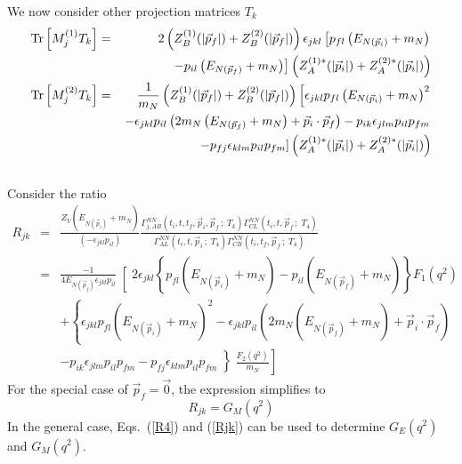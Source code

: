 \documentclass[12pt]{article}
\begin{document}
We now consider other projection matrices $T_k$
\begin{eqnarray}
{\rm Tr}\left[M_j^{(1)} T_k\right]
 &=& 2\left(Z_B^{(1)}(|\vec{p}_f|)+Z_B^{(2)}(|\vec{p}_f|)\right)
     \epsilon_{jkl}\left[p_{fl}\left(E_{N(\vec{p}_i)}+m_N\right)
     \right. \nonumber \\
  && \left. -p_{il}\left(E_{N(\vec{p}_f)}+m_N\right)\right]
     \left(Z_A^{(1)*}(|\vec{p}_i|)+Z_A^{(2)*}(|\vec{p}_i|)\right) \nonumber \\
{\rm Tr}\left[M_j^{(2)} T_k\right]
 &=& \frac{1}{m_N}\left(Z_B^{(1)}(|\vec{p}_f|)+Z_B^{(2)}(|\vec{p}_f|)\right)
     \left[\epsilon_{jkl}p_{fl}\left(E_{N(\vec{p}_i)}+m_N\right)^2
     \right. \nonumber \\
  && \left. -\epsilon_{jkl}p_{il}\left(2m_N\left(E_{N(\vec{p}_f)}+m_N\right)
     +\vec p_i\cdot\vec p_f\right)
     -p_{ik}\epsilon_{jlm}p_{il}p_{fm} \right.\nonumber \\
  && \left. -p_{fj}\epsilon_{klm}p_{il}p_{fm}
     \right]
     \left(Z_A^{(1)*}(|\vec{p}_i|)+Z_A^{(2)*}(|\vec{p}_i|)\right) \nonumber \\
\nonumber
\end{eqnarray}
Consider the ratio
\begin{eqnarray}
R_{jk} &=& \frac{Z_V\left(E_{N(\vec{p}_i)}+m_N\right)}
      {\left(-\epsilon_{jkl}p_{il}\right)}
      \frac{\Gamma^{NN}_{j,AB}(t_i,t,t_f,\vec p_i,\vec p_f\,;\;T_k)
      \Gamma^{NN}_{CL}(t_i,t,\vec p_f\,;\;T_4)}
      {\Gamma^{NN}_{AL}(t_i,t,\vec p_i\,;\;T_4)
      \Gamma^{NN}_{CB}(t_i,t_f,\vec p_f\,;\;T_4)} 
      \label{Rjkdef} \\
    &=& \left.\frac{-1}{4E_{N(\vec{p}_f)}\epsilon_{jkl}p_{il}}
        \right[
        2\epsilon_{jkl}\left\{p_{fl}\left(E_{N(\vec{p}_i)}+m_N\right)
        -p_{il}\left(E_{N(\vec{p}_f)}+m_N\right)\right\}F_1(q^2)
        \nonumber \\
     && +\left\{\epsilon_{jkl}p_{fl}\left(E_{N(\vec{p}_i)}+m_N\right)^2
        -\epsilon_{jkl}p_{il}\left(2m_N\left(E_{N(\vec{p}_f)}+m_N\right)
        +\vec p_i\cdot\vec p_f\right)
        \right.\nonumber \\
     && \left. -p_{ik}\epsilon_{jlm}p_{il}p_{fm}
        -p_{fj}\epsilon_{klm}p_{il}p_{fm}
        \left\}\frac{F_2(q^2)}{m_N}
        \right.\right]
        \label{Rjk}
\end{eqnarray}
For the special case of $\vec p_f=\vec 0$, the expression simplifies to
\[
R_{jk} = G_M(q^2)
\]
In the general case, Eqs.~(\ref{R4}) and (\ref{Rjk}) can be used to determine
$G_E(q^2)$ and $G_M(q^2)$.
\end{document}

